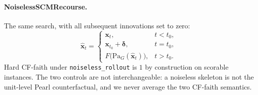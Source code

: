\documentclass{article}
\newcommand{\bx}{\mathbf{x}}
\newcommand{\Pa}{\mathrm{Pa}}
\begin{document}
\paragraph{NoiselessSCMRecourse.}
The same search, with all subsequent innovations set to zero:
\begin{equation}
  \hat{\bx}_t
  =
  \begin{cases}
    \bx_t, & t<t_0,\\
    \bx_{t_0}+\boldsymbol{\delta}, & t=t_0,\\
    F\bigl(\Pa_G(\hat{\bx}_t)\bigr), & t>t_0.
  \end{cases}
\end{equation}
Hard CF-faith under \texttt{noiseless\_rollout} is $1$ by construction on scorable instances.  The two controls are not interchangeable: a noiseless skeleton is not the unit-level Pearl counterfactual, and we never average the two CF-faith semantics.
\end{document}
